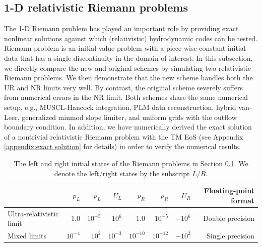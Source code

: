 \documentclass[twocolumn]{aastex63}
\begin{document}
\subsection{1-D relativistic Riemann problems}
\label{subsec:1-DReletivisticRiemann problems}
The 1-D Riemann problem \citep{SOD1978} has played an important role by providing exact nonlinear solutions against which (relativistic) hydrodynamic codes can be tested. Riemann problem is an initial-value problem with a piece-wise constant initial data that has a single discontinuity in the domain of interest. In this subsection, we directly compare the new and original schemes by simulating two relativistic Riemann problems. We then demonstrate that the new scheme handles both the UR and NR limits very well. By contrast, the original scheme severely suffers from numerical errors in the NR limit. Both schemes share the same numerical setup, e.g., MUSCL-Hancock integration, PLM data reconstruction, hybrid van-Leer, generalized minmod slope limiter, and uniform grids with the outflow boundary condition. In addition, we have numerically derived the exact solution of a nontrivial relativistic Riemann problem with the TM EoS (see Appendix \ref{appendix:exact solution} for details) in order to verify the numerical results.


\begin{table}[t]
\caption{The left and right initial states of the Riemann problems in Section \ref{subsec:1-DReletivisticRiemann problems}. We denote the left/right states by the subscript $L/R$.}
\label{tb:IC_RiemannProblems}
\begin{tabular}{@{}lrrrrrrr@{}}
\hline
                         & $p_{L}$   & $\rho_{L}$ & $U_{L}$   & $p_{R}$    & $\rho_{R}$ & $U_{R}$   & Floating-point format \\ \hline
Ultra-relativistic limit & $1.0$     & $10^{-5}$  & $10^6$    & $1.0$      & $10^{-5}$  & $-10^{6}$ & Double precision      \\ \hline
Mixed limits             & $10^{-4}$ & $10^{2}$   & $10^{-3}$ & $10^{-10}$ & $10^{-12}$ & $-10^{2}$  & Single precision      \\ \hline
\end{tabular}
\end{table}

\end{document}
